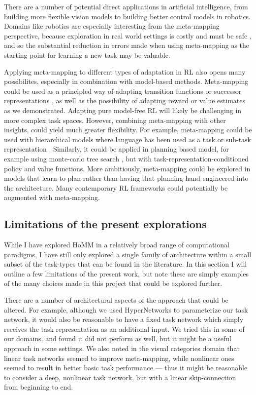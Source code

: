 There are a number of potential direct applications in artificial intelligence, from building more flexible vision models to building better control models in robotics. Domains like robotics are especially interesting from the meta-mapping perspective, because exploration in real world settings is costly and must be safe \citep{Turchetta2016}, and so the substantial reduction in errors made when using meta-mapping as the starting point for learning a new task may be valuable. \par 

Applying meta-mapping to different types of adaptation in RL also opens many possibilites, especially in combination with model-based methods. Meta-mapping could be used as a principled way of adapting transition functions or successor representations \citep[c.f.][]{Madarasz2019}, as well as the possibility of adapting reward or value estimates as we demonstrated. Adapting pure model-free RL will likely be challenging in more complex task spaces. However, combining meta-mapping with other insights, could yield much greater flexibility. For example, meta-mapping could be used with hierarchical models where language has been used as a task or sub-task representation \citep[e.g.][]{Jiang2019}. Similarly, it could be applied in planning based model, for example using monte-carlo tree search \citep[as in e.g.][]{Silver2016, Silver2017}, but with task-representation-conditioned policy and value functions. More ambitiously, meta-mapping could be explored in models that learn to plan \citep{Guez2019} rather than having that planning hand-engineered into the architecture. Many contemporary RL frameworks could potentially be augmented with meta-mapping. \par

\subsection{Limitations of the present explorations}

While I have explored HoMM in a relatively broad range of computational paradigms, I have still only explored a single family of architecture within a small subset of the task-types that can be found in the literature. In this section I will outline a few limitations of the present work, but note these are simply examples of the many choices made in this project that could be explored further. \par

There are a number of architectural aspects of the approach that could be altered. For example, although we used HyperNetworks to parameterize our task network, it would also be reasonable to have a fixed task network which simply receives the task representation as an additional input. We tried this in some of our domains, and found it did not perform as well, but it might be a useful approach in some settings. We also noted in the visual categories domain that linear task networks seemed to improve meta-mapping, while nonlinear ones seemed to result in better basic task performance --- thus it might be reasonable to consider a deep, nonlinear task network, but with a linear skip-connection from beginning to end. \par 

